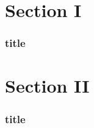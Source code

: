 \documentclass{beamer}
\begin{document}
\section{Section I}

{%
    \vspace*{-1.04cm}
    \begin{frame}
    \frametitle{title}
    \end{frame}
}

\section{Section II}

    \begin{frame}
    \frametitle{title}
    \end{frame}
\end{document}
